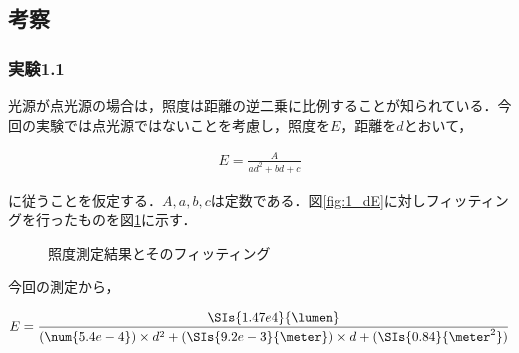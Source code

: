 \documentclass[1_power_supply.tex]{subfiles}
\begin{document}
  \subsection{考察}

    \subsubsection{実験1.1}

      光源が点光源の場合は，照度は距離の逆二乗に比例することが知られている．今回の実験では点光源ではないことを考慮し，照度を$E$，距離を$d$とおいて，

      \begin{align}
        E = \frac{A}{ad^2+bd+c}
      \end{align}

      に従うことを仮定する．$A,a,b,c$は定数である．図\ref{fig:1_dE}に対しフィッティングを行ったものを図\ref{fig:1_dE_fit}に示す．


      \begin{figure}[htbp]
        \begin{center}
          \caption{照度測定結果とそのフィッティング}\label{fig:1_dE_fit}
        \end{center}
      \end{figure}

      今回の測定から，

      \begin{align}
        E = \frac{\SIs{1.47e4}{\lumen}}{(\num{5.4e-4})\times d^2+(\SIs{9.2e-3}{\meter})\times d+(\SIs{0.84}{\meter^2})}
      \end{align}
\end{document}
